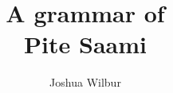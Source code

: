



\title{A grammar of \\ Pite Saami}%
\author{Joshua Wilbur}
\dedication{Muv vienagijda Árjepluovest} 
\renewcommand{\lsBackBody}{This grammar of \PS\ (Uralic; Sweden) is a grammar of \PS.}%
\renewcommand{\lsBackTitle}{Biddumsáme giella}%





\maketitle  
\frontmatter 

\tableofcontents

%

%
\cleardoublepage%

\cleardoublepage{}%

\cleardoublepage{}%

\mainmatter
\ohead{\headmark}

